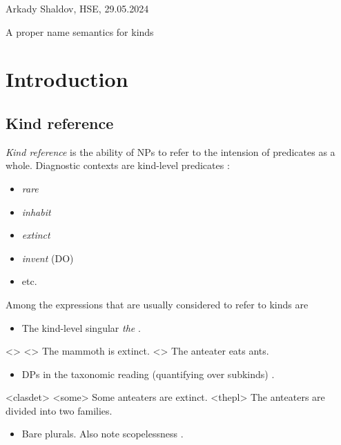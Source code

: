 \documentclass[a4paper,12pt]{article}
\begin{document}

Arkady Shaldov, HSE, 29.05.2024

{\huge A proper name semantics for kinds}

\section{Introduction}

\subsection{Kind reference}

\emph{Kind reference} is the ability of NPs to refer to the intension of predicates as a whole. Diagnostic contexts are kind-level predicates \parencite{carlson1977referencekindsenglish}:

\begin{itemize}
    \item \textit{rare}
    \item \textit{inhabit}
    \item \textit{extinct}
    \item \textit{invent} (DO)
    \item etc.
\end{itemize}

Among the expressions that are usually considered to refer to kinds are

\begin{itemize}
    \item The kind-level singular \textit{the} \parencite{carlson1977referencekindsenglish}.
\end{itemize}

\pex<>
    \a<> The mammoth is extinct.
    \a<> The anteater eats ants.
\xe

\begin{itemize}
    \item DPs in the taxonomic reading (quantifying over subkinds) \parencite{dayal2004numbermarkingdefiniteness}.     
\end{itemize}    

\pex<clasdet>
    \a<some> Some anteaters are extinct.
    \a<thepl> The anteaters are divided into two families.
\xe

\begin{itemize}
    \item Bare plurals. Also note scopelessness \parencite{chierchia1998referencekindslanguages}.
\end{itemize}
    
\end{document}
